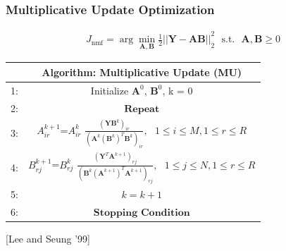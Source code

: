 \documentclass{beamer}
\begin{document}
\begin{frame}
\frametitle{Multiplicative Update Optimization}

	\begin{align*} 
		J_{\text{nmf}} = \arg\min_{\mathbf{A,B}} {\frac{1}{2}||\mathbf{Y} - \mathbf{A} \mathbf{B}||}_{2}^2  \ \ \    \text{s.t.} \ \ \ \mathbf{A}, \mathbf{B}  \ge 0
	\end{align*}
	
\begin{table}[h]
      \label{tab:MU} 
\centering
  \begin{tabular}{c || c |  }
        \hline
              & Algorithm: Multiplicative Update (MU) \\ \hline \hline
    1: & Initialize  $\mathbf{A}^0$, $\mathbf{B}^0$, k = 0  \\ \hline
    2: & $\textbf{Repeat}$ \\ \hline
    3: &     $A_{ir}^{k+1}$=$A_{ir}^k$ $\frac{\left(\mathbf{Y}\mathbf{B}^k\right)_{ir}}{\left(\mathbf{A}^k(\mathbf{B}^k)^T\mathbf{B}^k\right)_{ir}}, \ \ \ 1 \le i \le M, 1 \le r \le R $\\  \hline
    4: &     $B_{rj}^{k+1}$=$B_{rj}^k$ $\frac{\left(\mathbf{Y}^T\mathbf{A}^{k+1}\right)_{rj}}{\left(\mathbf{B}^k(\mathbf{A}^{k+1})^T\mathbf{A}^{k+1}\right)_{rj}}, \ \ \ 1 \le j \le N, 1 \le r \le R$ \\  \hline
    5: &     $k = k + 1$ \\ \hline
    6: & $\textbf{Stopping Condition}$ \\ \hline
    \hline
  \end{tabular}
\end{table}
[Lee and Seung '99]

\end{frame}
\end{document}
